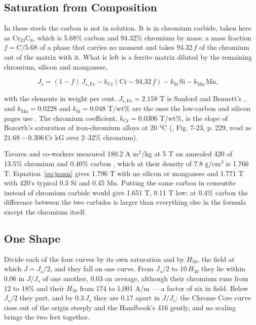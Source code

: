 \documentclass[
  11pt,
]{article}
\begin{document}
\subsection{Saturation from Composition}\label{annealed-js}

In these steels the carbon is not in solution. It is in chromium carbide, taken here as Cr\(_{23}\)C\(_{6}\), which is 5.68\% carbon and 94.32\% chromium by mass: a mass fraction \(f = \mathrm{C}/5.68\) of a phase that carries no moment and takes 94.32\,\(f\) of the chromium out of the matrix with it. What is left is a ferrite matrix diluted by the remaining chromium, silicon and manganese,

\begin{equation}\label{eq:jsann}
J_s = (1 - f)\,J_{s,\mathrm{Fe}} - k_\mathrm{Cr}\left(\mathrm{Cr} - 94.32\,f\right) - k_\mathrm{Si}\,\mathrm{Si} - k_\mathrm{Mn}\,\mathrm{Mn},
\end{equation}

with the elements in weight per cent. \(J_{s,\mathrm{Fe}} = 2.158\) T is Sanford and Bennett's \cite{sanford1941}, and \(k_\mathrm{Mn} = 0.0228\) and \(k_\mathrm{Si} = 0.048\) T/wt\% are the ones the low-carbon and silicon pages use \cite{meeker-lowcarbon,meeker-si}. The chromium coefficient, \(k_\mathrm{Cr} = 0.0306\) T/wt\%, is the slope of Bozorth's saturation of iron-chromium alloys at 20 °C (\cite{bozorth1951}, Fig. 7-23, p. 229, read as \(21.68 - 0.306\,\mathrm{Cr}\) kG over 2--32\% chromium).

Tavares and co-workers measured 180.2 A m\(^2\)/kg at 5 T on annealed 420 of 13.5\% chromium and 0.40\% carbon \cite{tavares}, which at their density of 7.8 g/cm\(^3\) is 1.766 T. Equation~\eqref{eq:jsann} gives 1.796 T with no silicon or manganese and 1.771 T with 420's typical 0.3 Si and 0.45 Mn. Putting the same carbon in cementite instead of chromium carbide would give 1.651 T, 0.11 T low: at 0.4\% carbon the difference between the two carbides is larger than everything else in the formula except the chromium itself.

\subsection{One Shape}\label{master}

Divide each of the four curves by its own saturation and by \(H_{50}\), the field at which \(J = J_s/2\), and they fall on one curve. From \(J_s/2\) to \(10\,H_{50}\) they lie within 0.06 in \(J/J_s\) of one another, 0.03 on average, although their chromium runs from 12 to 18\% and their \(H_{50}\) from 174 to 1,001 A/m --- a factor of six in field. Below \(J_s/2\) they part, and by \(0.3\,J_s\) they are 0.17 apart in \(J/J_s\): the Chrome Core curve rises out of the origin steeply and the Handbook's 416 gently, and no scaling brings the two feet together.
\end{document}
